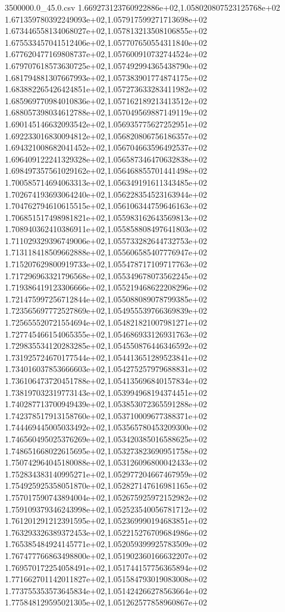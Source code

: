 \begin{filecontents*}{3500000.0_45.0.csv}
1.669273123760922886e+02,1.058020807523125768e+02
1.671359780392249093e+02,1.057917599271713698e+02
1.673446558134068027e+02,1.057813213508106855e+02
1.675533457041512406e+02,1.057707650554311840e+02
1.677620477169808737e+02,1.057600910732744524e+02
1.679707618573630725e+02,1.057492994365438790e+02
1.681794881307667993e+02,1.057383901774874175e+02
1.683882265426424851e+02,1.057273633283411982e+02
1.685969770984010836e+02,1.057162189213413512e+02
1.688057398034612788e+02,1.057049569887149119e+02
1.690145146632093542e+02,1.056935775627252951e+02
1.692233016830094812e+02,1.056820806756186357e+02
1.694321008682041452e+02,1.056704663596492537e+02
1.696409122241329328e+02,1.056587346470632838e+02
1.698497357561029162e+02,1.056468855701441498e+02
1.700585714694063313e+02,1.056349191611343485e+02
1.702674193693064240e+02,1.056228354523163944e+02
1.704762794610615515e+02,1.056106344759646163e+02
1.706851517498981821e+02,1.055983162643569813e+02
1.708940362410386911e+02,1.055858808497641803e+02
1.711029329396749006e+02,1.055733282644732753e+02
1.713118418509662888e+02,1.055606585407776947e+02
1.715207629800919733e+02,1.055478717109717763e+02
1.717296963321796568e+02,1.055349678073562245e+02
1.719386419123306666e+02,1.055219468622208296e+02
1.721475997256712844e+02,1.055088089078799385e+02
1.723565697772527869e+02,1.054955539766369839e+02
1.725655520721554694e+02,1.054821821007981271e+02
1.727745466154065355e+02,1.054686933126931763e+02
1.729835534120283285e+02,1.054550876446346592e+02
1.731925724670177544e+02,1.054413651289523841e+02
1.734016037853666603e+02,1.054275257979688831e+02
1.736106473720451788e+02,1.054135696840157834e+02
1.738197032319773143e+02,1.053994968194374451e+02
1.740287713700949439e+02,1.053853072365591288e+02
1.742378517913158760e+02,1.053710009677388371e+02
1.744469445005033492e+02,1.053565780453209300e+02
1.746560495025376269e+02,1.053420385016588625e+02
1.748651668022615695e+02,1.053273823690951758e+02
1.750742964045180088e+02,1.053126096800042433e+02
1.752834383140995271e+02,1.052977204667467959e+02
1.754925925358051870e+02,1.052827147616981165e+02
1.757017590743894004e+02,1.052675925972152982e+02
1.759109379346243998e+02,1.052523540056781712e+02
1.761201291212391595e+02,1.052369990194683851e+02
1.763293326389372453e+02,1.052215276709684986e+02
1.765385484924145771e+02,1.052059399925783509e+02
1.767477766863498800e+02,1.051902360166632207e+02
1.769570172254058491e+02,1.051744157756365894e+02
1.771662701142011827e+02,1.051584793019083008e+02
1.773755353573645834e+02,1.051424266278563664e+02
1.775848129595021305e+02,1.051262577858960867e+02

\end{filecontents*}
